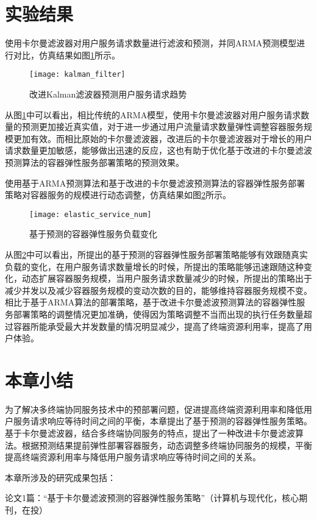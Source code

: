 

\section{实验结果}\label{sec:elastic_service_experiment_results}

使用卡尔曼滤波器对用户服务请求数量进行滤波和预测，并同ARMA预测模型进行对比，仿真结果如图\ref{fig:elastic_service_kalman_filter}所示。

\begin{figure}[!htbp]
    \centering
    \texttt{[image: kalman\_filter]}\hfill
  \caption{改进Kalman滤波器预测用户服务请求趋势}
  \label{fig:elastic_service_kalman_filter}
\end{figure}

从图\ref{fig:elastic_service_kalman_filter}中可以看出，相比传统的ARMA模型，使用卡尔曼滤波器对用户服务请求数量的预测更加接近真实值，对于进一步通过用户流量请求数量弹性调整容器服务规模更加有效。而相比原始的卡尔曼滤波器，改进后的卡尔曼滤波器对于增长的用户请求数量更加敏感，能够做出迅速的反应，这也有助于优化基于改进的卡尔曼滤波预测算法的容器弹性服务部署策略的预测效果。

使用基于ARMA预测算法和基于改进的卡尔曼滤波预测算法的容器弹性服务部署策略对容器服务的规模进行动态调整，仿真结果如图\ref{fig:elastic_service_num}所示。

\begin{figure}[!htbp]
    \centering
    \texttt{[image: elastic\_service\_num]}\hfill
  \caption{基于预测的容器弹性服务负载变化}
  \label{fig:elastic_service_num}
\end{figure}

从图\ref{fig:elastic_service_num}中可以看出，所提出的基于预测的容器弹性服务部署策略能够有效跟随真实负载的变化，在用户服务请求数量增长的时候，所提出的策略能够迅速跟随这种变化，动态扩展容器服务规模，当用户服务请求数量减少的时候，所提出的策略出于减少并发以及减少容器服务规模的变动次数的目的，能够维持容器服务规模不变。相比于基于ARMA算法的部署策略，基于改进卡尔曼滤波预测算法的容器弹性服务部署策略的调整情况更加准确，使得因为策略调整不当而出现的执行任务数量超过容器所能承受最大并发数量的情况明显减少，提高了终端资源利用率，提高了用户体验。

\section{本章小结}\label{sec:elastic_service_summary}

为了解决多终端协同服务技术中的预部署问题，促进提高终端资源利用率和降低用户服务请求响应等待时间之间的平衡，本章提出了基于预测的容器弹性服务策略。基于卡尔曼滤波器，结合多终端协同服务的特点，提出了一种改进卡尔曼滤波算法。根据预测结果提前弹性部署容器服务，动态调整多终端协同服务的规模，平衡提高终端资源利用率与降低用户服务请求响应等待时间之间的关系。

本章所涉及的研究成果包括：

论文1篇：“基于卡尔曼滤波预测的容器弹性服务策略”（计算机与现代化，核心期刊，在投）